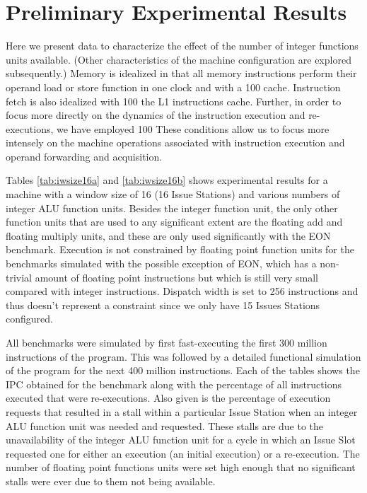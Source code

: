 \documentclass[10pt,dvips]{article}
\begin{document}
\section{Preliminary Experimental Results}
%
Here we present data to characterize the effect of the
number of integer functions units available.
(Other characteristics of the machine configuration
are explored subsequently.)
Memory is idealized in that all memory instructions perform
their operand load or store
function in one clock and with a 100%
cache.  Instruction fetch is also idealized with 100%
the L1 instructions cache.  Further, in order to focus more
directly on the dynamics of the instruction execution and re-executions,
we have employed 100%
These conditions allow us to focus more intensely on the
machine operations associated with instruction execution and
operand forwarding and acquisition.

Tables \ref{tab:iwsize16a} 
and \ref{tab:iwsize16b} 
shows experimental results
for a machine with a window size of 16 (16 Issue Stations) and various
numbers of integer ALU function units.  
Besides the integer function unit, the only other function units
that are used to any significant extent are the floating add
and floating multiply units, and these are only used significantly 
with the EON benchmark.
Execution is not constrained
by floating point function units
for the benchmarks simulated with the possible exception of EON,
which has a non-trivial amount of floating point instructions
but which is still very small compared with integer instructions.
Dispatch width is set to 256 instructions and thus doesn't 
represent a constraint since we only have 15 Issues Stations configured.

All benchmarks were simulated by first fast-executing the
first 300 million instructions of the program.  This was
followed by a detailed functional simulation of the program
for the next 400 million instructions.
Each of the tables shows the IPC obtained for the benchmark
along with the percentage of all instructions executed that
were re-executions.  
Also given is the percentage of execution
requests that resulted in a stall within a particular Issue Station
when an integer ALU function unit was needed and requested.
These stalls are due to the unavailability of the integer ALU function unit
for a cycle in which an Issue Slot requested one for either an
execution (an initial execution) or a re-execution.
The number of floating point functions units were set high enough
that no significant stalls were ever due to them not being available.
\end{document}
